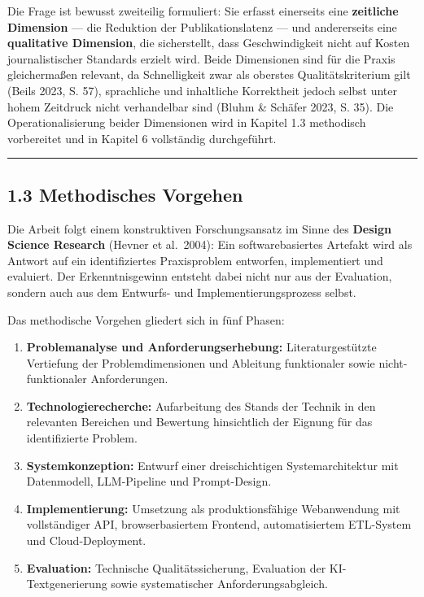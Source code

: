 Die Frage ist bewusst zweiteilig formuliert: Sie erfasst einerseits eine
\textbf{zeitliche Dimension} --- die Reduktion der Publikationslatenz
--- und andererseits eine \textbf{qualitative Dimension}, die
sicherstellt, dass Geschwindigkeit nicht auf Kosten journalistischer
Standards erzielt wird. Beide Dimensionen sind für die Praxis
gleichermaßen relevant, da Schnelligkeit zwar als oberstes
Qualitätskriterium gilt (Beils 2023, S. 57), sprachliche und inhaltliche
Korrektheit jedoch selbst unter hohem Zeitdruck nicht verhandelbar sind
(Bluhm \& Schäfer 2023, S. 35). Die Operationalisierung beider
Dimensionen wird in Kapitel 1.3 methodisch vorbereitet und in Kapitel 6
vollständig durchgeführt.

\begin{center}\rule{0.5\linewidth}{0.5pt}\end{center}

\subsection{1.3 Methodisches Vorgehen}\label{methodisches-vorgehen}

Die Arbeit folgt einem konstruktiven Forschungsansatz im Sinne des
\textbf{Design Science Research} (Hevner et al.~2004): Ein
softwarebasiertes Artefakt wird als Antwort auf ein identifiziertes
Praxisproblem entworfen, implementiert und evaluiert. Der
Erkenntnisgewinn entsteht dabei nicht nur aus der Evaluation, sondern
auch aus dem Entwurfs- und Implementierungsprozess selbst.

Das methodische Vorgehen gliedert sich in fünf Phasen:

\begin{enumerate}
\def\labelenumi{\arabic{enumi}.}
\tightlist
\item
  \textbf{Problemanalyse und Anforderungserhebung:} Literaturgestützte
  Vertiefung der Problemdimensionen und Ableitung funktionaler sowie
  nicht-funktionaler Anforderungen.
\item
  \textbf{Technologierecherche:} Aufarbeitung des Stands der Technik in
  den relevanten Bereichen und Bewertung hinsichtlich der Eignung für
  das identifizierte Problem.
\item
  \textbf{Systemkonzeption:} Entwurf einer dreischichtigen
  Systemarchitektur mit Datenmodell, LLM-Pipeline und Prompt-Design.
\item
  \textbf{Implementierung:} Umsetzung als produktionsfähige Webanwendung
  mit vollständiger API, browserbasiertem Frontend, automatisiertem
  ETL-System und Cloud-Deployment.
\item
  \textbf{Evaluation:} Technische Qualitätssicherung, Evaluation der
  KI-Textgenerierung sowie systematischer Anforderungsabgleich.
\end{enumerate}

